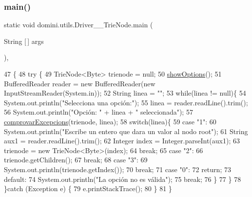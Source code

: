 \subsubsection{\texorpdfstring{main()}{main()}}
{\footnotesize\ttfamily static void domini.\+utils.\+Driver\+\_\+\+\_\+\+Trie\+Node.\+main (\begin{DoxyParamCaption}\item[{String \mbox{[}$\,$\mbox{]}}]{args }\end{DoxyParamCaption})\hspace{0.3cm}{\ttfamily [inline]}, {\ttfamily [static]}}


\begin{DoxyCode}
47                                            \{
48     \textcolor{keywordflow}{try} \{
49         TrieNode<Byte> trienode = null;
50         \hyperlink{classdomini_1_1utils_1_1Driver____TrieNode_ab9e971ebb4f8e219efaab32c6654243a}{showOptions}();
51         BufferedReader reader = \textcolor{keyword}{new} BufferedReader(\textcolor{keyword}{new} InputStreamReader(System.in));
52         String linea = \textcolor{stringliteral}{""};
53         \textcolor{keywordflow}{while}(linea != null)\{
54             System.out.println(\textcolor{stringliteral}{"Selecciona una opción:"});
55             linea = reader.readLine().trim();
56             System.out.println(\textcolor{stringliteral}{"Opción: "} + linea + \textcolor{stringliteral}{" seleccionada"});
57             \hyperlink{classdomini_1_1utils_1_1Driver____TrieNode_aa763a74162f647ee153c5cea01d371d0}{comprovarExcepcions}(trienode, linea);
58             \textcolor{keywordflow}{switch}(linea)\{
59                 \textcolor{keywordflow}{case} \textcolor{stringliteral}{"1"}:
60                     System.out.println(\textcolor{stringliteral}{"Escribe un entero que dara un valor al nodo root"});
61                     String aux1 = reader.readLine().trim();
62                     Integer index = Integer.parseInt(aux1);
63                     trienode = \textcolor{keyword}{new} TrieNode<Byte>(index);
64                 \textcolor{keywordflow}{break};
65                 \textcolor{keywordflow}{case} \textcolor{stringliteral}{"2"}:
66                     trienode.getChildren();
67                 \textcolor{keywordflow}{break};
68                 \textcolor{keywordflow}{case} \textcolor{stringliteral}{"3"}:
69                     System.out.println(trienode.getIndex());
70                 \textcolor{keywordflow}{break};
71                 \textcolor{keywordflow}{case} \textcolor{stringliteral}{"0"}:
72                     \textcolor{keywordflow}{return};
73                 \textcolor{keywordflow}{default}:
74                     System.out.println(\textcolor{stringliteral}{"La opción no es válida"});
75                 \textcolor{keywordflow}{break};
76             \}
77         \}
78     \}\textcolor{keywordflow}{catch} (Exception e) \{
79         e.printStackTrace();
80     \}
81     \}
\end{DoxyCode}
